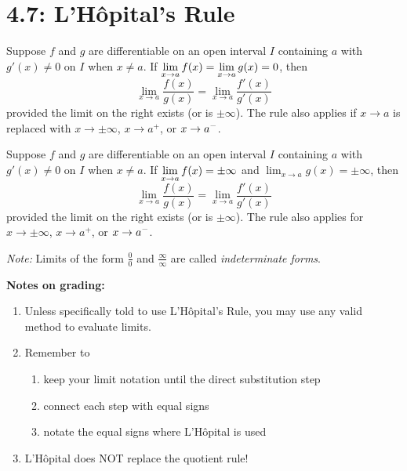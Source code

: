 \documentclass[mathNotesPreamble]{subfiles}
\begin{document}
\section{4.7: L'H\^ opital's Rule}
\vspace*{-\baselineskip}
\begin{thmBox*}
  Suppose $f$ and $g$ are differentiable on an open interval $I$ containing $a$ with $g'(x)\neq 0$ on $I$ when $x\neq a$. If $\ds\lim_{x\to a} f(x)=\lim_{x\to a} g(x)=0$, then
    \[\lim_{x\to a}\frac{f(x)}{g(x)}=\lim_{x\to a}\frac{f'(x)}{g'(x)}\]
  provided the limit on the right exists (or is $\pm\infty$). The rule also applies if $x\to a$ is replaced with $x\to\pm\infty$, $x\to a^+$, or $x\to a\inv[]$.
\end{thmBox*}

\vspace*{-\baselineskip}
\begin{thmBox*}
  Suppose $f$ and $g$ are differentiable on an open interval $I$ containing $a$ with $g'(x)\neq 0$ on $I$ when $x\neq a$. If $\ds\lim_{x\to a} f(x)= \pm\infty$ and $\lim_{x\to a} g(x)=\pm\infty$, then
    \[\lim_{x\to a}\frac{f(x)}{g(x)}=\lim_{x\to a}\frac{f'(x)}{g'(x)}\]
  provided the limit on the right exists (or is $\pm\infty$). The rule also applies for $x\to\pm\infty$, $x\to a^+$, or $x\to a\inv[]$.
\end{thmBox*}

\textit{Note:} Limits of the form $\frac{0}{0}$ and $\frac{\infty}{\infty}$ are called \textit{indeterminate forms}.

\textbf{Notes on grading:}
\begin{enumerate}
  \item Unless specifically told to use L'H\^opital's Rule, you may use any valid method to evaluate limits.
  \item Remember to 
  \vspace*{-0.25\baselineskip}
    \begin{enumerate}
      \item keep your limit notation until the direct substitution step
      \item connect each step with equal signs
      \item notate the equal signs where L'H\^opital is used
    \end{enumerate}
  \item L'H\^opital does NOT replace the quotient rule!
\end{enumerate}
\pagebreak
\end{document}
